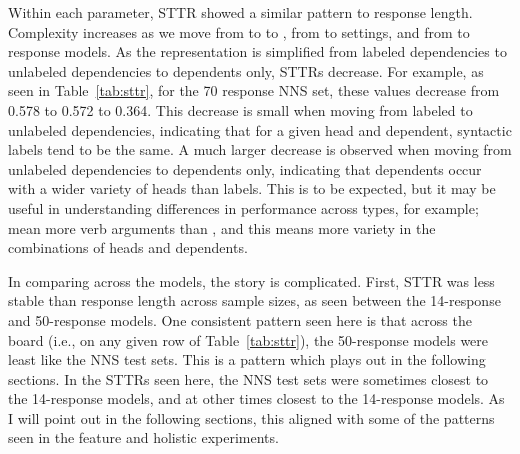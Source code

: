 Within each parameter, STTR showed a similar pattern to response length. Complexity increases as we move from  to  to , from  to  settings, and from  to  response models. As the representation is simplified from labeled dependencies to unlabeled dependencies to dependents only, STTRs decrease. 
For example, as seen in Table~\ref{tab:sttr}, for the 70 response NNS set, these values decrease from 0.578 to 0.572 to 0.364.
This decrease is small when moving from labeled to unlabeled dependencies, indicating that for a given head and dependent, syntactic labels tend to be the same. A much larger decrease is observed when moving from unlabeled dependencies to dependents only, indicating that dependents occur with a wider variety of heads than labels. This is to be expected, but it may be useful in understanding differences in performance across  types, for example;  mean more verb arguments than , and this means more variety in the combinations of heads and dependents.

In comparing across the models, the story is complicated. First, STTR was less stable than response length across sample sizes, as seen between the 14-response and 50-response  models. One consistent pattern seen here is that across the board (i.e., on any given row of Table~\ref{tab:sttr}), the 50-response  models were least like the NNS test sets. This is a pattern which plays out in the following sections. In the STTRs seen here, the NNS test sets were sometimes closest to the 14-response  models, and at other times closest to the 14-response  models. As I will point out in the following sections, this aligned with some of the patterns seen in the feature and holistic experiments.

